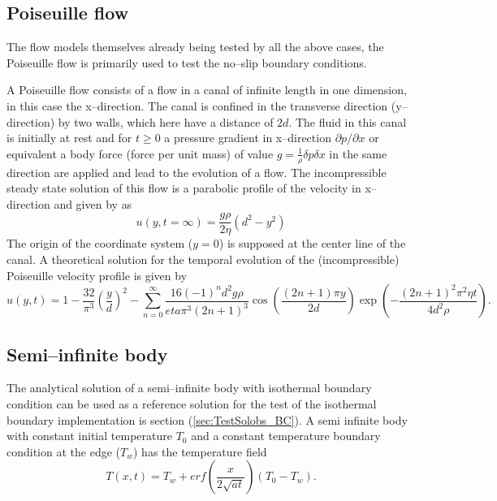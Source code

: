 \documentclass{report}
\begin{document}
\subsection{Poiseuille flow}
\label{sec:genIntroPoiseuille}
The flow models themselves already being tested by all the above cases, the Poiseuille flow is primarily used to test the no--slip boundary conditions. 

A Poiseuille flow consists of a flow in a canal of infinite length in one dimension, in this case the x--direction. The canal is confined  in the transverse direction (y--direction) by two walls, which here have a distance of $2d$. The fluid in this canal is initially at rest and for $t\geq0$ a pressure gradient in x--direction $\partial p/\partial x $ or equivalent a body force (force per unit mass) of value $g=\frac{1}{\rho}{\delta p}{\delta x}$ \cite{Sigalotti2003} in the same direction are applied and lead to the evolution of a flow. The incompressible steady state solution of this flow is a parabolic profile of the velocity in x--direction and given by \cite{Sigalotti2003} as
\begin{equation}
\label{eq:Poiseuille_steadyState_U}
 u(y,t=\infty)=\frac{g \rho}{2 \eta}(d^2-y^2)
\end{equation}
The origin of the coordinate system ($y=0$) is supposed at the center line of the canal.
A theoretical solution for the temporal evolution of the (incompressible) Poiseuille velocity profile is given by \cite{Sigalotti2003}
\begin{equation}
\label{eq:Poiseuille_Series}
 u(y,t)=1-\frac{32}{\pi^3}\left(\frac{y}{d}\right)^2 -\sum_{n=0}^\infty \frac{16(-1)^n d^2 g \rho}{eta \pi^3 (2 n +1)^3}\cos \left(\frac{(2n+1)\pi y}{2 d} \right)\exp \left(- \frac{(2n+1)^2\pi^2\eta t}{4d^2\rho} \right).
\end{equation}
 

\subsection{Semi--infinite body}
\label{sec:genIntroSemiInfBody}
The analytical solution of a semi--infinite body with isothermal boundary condition can be used as a reference solution for the test of the isothermal boundary implementation is section (\ref{sec:TestSolobs_BC}).
A semi infinite body with constant initial temperature $T_0$  and a constant temperature boundary condition at the edge ($T_w$) has the temperature field \cite{Carslaw1959}
\begin{equation}
\label{eq:SemiInfBodySolution}
 T(x,t)=T_w+erf \left(\frac{x}{2 \sqrt{at}} \right) \left(T_0-T_w \right).
\end{equation}
\end{document}
